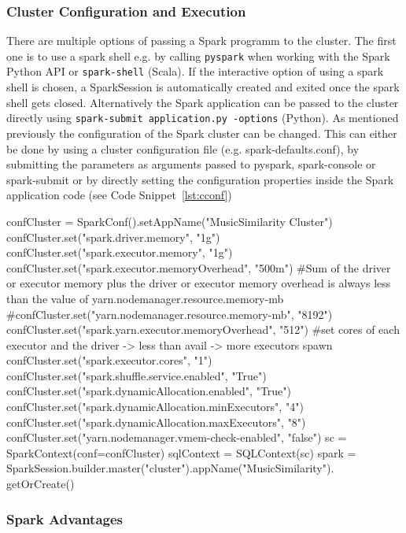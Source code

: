 \subsubsection{Cluster Configuration and Execution}\label{cconfexp}


There are multiple options of passing a Spark programm to the cluster. The first one is to use a spark shell e.g. by calling \lstinline{pyspark} when working with the Spark Python API or \lstinline{spark-shell} (Scala). If the interactive option of using a spark shell is chosen, a SparkSession is automatically created and exited once the spark shell gets closed. 
Alternatively the Spark application can be passed to the cluster directly using \lstinline{spark-submit application.py -options} (Python).
As mentioned previously the configuration of the Spark cluster can be changed. This can either be done by using a cluster configuration file (e.g. spark-defaults.conf), by submitting the parameters as arguments passed to pyspark, spark-console or spark-submit or by directly setting the configuration properties inside the Spark application code (see Code Snippet~\ref{lst:cconf})\\


\begin{pythonCode}[frame=single,label={lst:cconf},caption={Example cluster configuration Python},captionpos=b]
confCluster = SparkConf().setAppName("MusicSimilarity Cluster")
confCluster.set("spark.driver.memory", "1g")
confCluster.set("spark.executor.memory", "1g")
confCluster.set("spark.executor.memoryOverhead", "500m")
#Sum of the driver or executor memory plus the driver or executor memory overhead is always less than the value of yarn.nodemanager.resource.memory-mb
#confCluster.set("yarn.nodemanager.resource.memory-mb", "8192")
confCluster.set("spark.yarn.executor.memoryOverhead", "512")
#set cores of each executor and the driver -> less than avail -> more executors spawn
confCluster.set("spark.executor.cores", "1")
confCluster.set("spark.shuffle.service.enabled", "True")
confCluster.set("spark.dynamicAllocation.enabled", "True")
confCluster.set("spark.dynamicAllocation.minExecutors", "4")
confCluster.set("spark.dynamicAllocation.maxExecutors", "8")
confCluster.set("yarn.nodemanager.vmem-check-enabled", "false")
sc = SparkContext(conf=confCluster)
sqlContext = SQLContext(sc)
spark = SparkSession.builder.master("cluster").appName("MusicSimilarity").
	getOrCreate()
\end{pythonCode}

\subsubsection{Spark Advantages}

